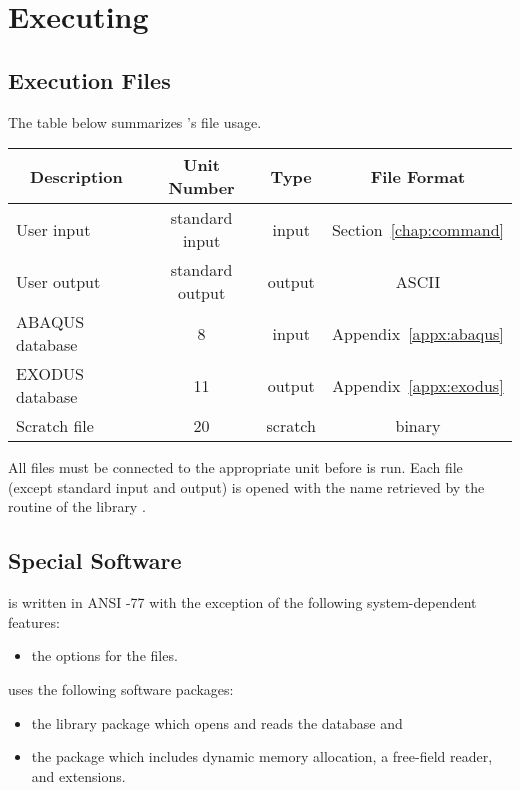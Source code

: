 \chapter{Executing \caps{\PROGRAM}} \label{chap:exec}



\section{Execution Files} \label{exec:files}

The table below summarizes \caps{\PROGRAM}'s file usage.

\begin{center} \begin{tabular}{||l|c|c|c||}
\hline
\multicolumn{1}{||c}{Description} &
\multicolumn{1}{|c}{Unit Number} &
\multicolumn{1}{|c}{Type} &
\multicolumn{1}{|c||}{File Format} \\
\hline
User input & standard input & input & Section~\ref{chap:command} \\
User output & standard output & output & ASCII \\
ABAQUS database & 8 & input & Appendix~\ref{appx:abaqus} \\
EXODUS database & 11 & output & Appendix~\ref{appx:exodus} \\
Scratch file & 20 & scratch & binary \\
\hline
\end{tabular} \end{center}

All files must be connected to the appropriate unit before
\caps{\PROGRAM} is run. Each file (except standard input and output) is
opened with the name retrieved by the  routine of the
 library \cite{bib:supes}.

\section{Special Software}

\caps{\PROGRAM} is written in ANSI -77 \cite{bib:f77}
with the exception of the following system-dependent features:
\setlength{\itemsep}{\medskipamount} \begin{itemize}
\item the  options for the files.
\end{itemize}

\caps{\PROGRAM} uses the following software packages:
\setlength{\itemsep}{\medskipamount} \begin{itemize}
\item the  library package which opens and reads the
 database and
\item the  package \cite{bib:supes} which includes dynamic
memory allocation, a free-field reader, and  extensions.
\end{itemize}
